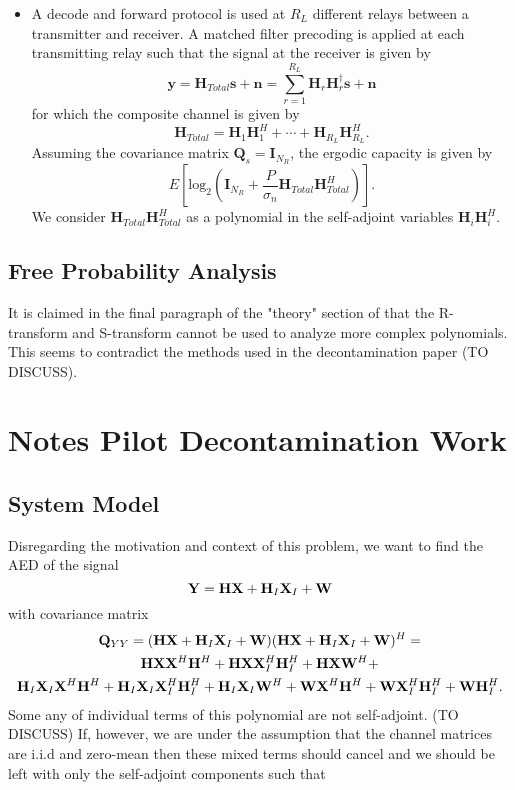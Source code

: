 \documentclass[12pt,a4paper]{report}
\begin{document}
\begin{itemize}
\item A decode and forward protocol is used at $R_L$ different relays between a transmitter and receiver. A matched filter precoding is applied at each transmitting relay such that the signal at the receiver is given by 
\begin{equation}
\mathbf{y} = \mathbf{H}_{Total} \mathbf{s} +  \mathbf{n} = \sum_{r=1}^{R_L} \mathbf{H}_{r}\mathbf{H}_{r}^{\dagger}\mathbf{s} +  \mathbf{n}
\end{equation}
for which the composite channel is given by 
\begin{equation}
\mathbf{H}_{Total} = \mathbf{H}_{1}\mathbf{H}_{1}^{H} +\cdots +\mathbf{H}_{R_L}\mathbf{H}_{R_L}^{H}.
\end{equation}
Assuming the covariance matrix $\mathbf{Q}_s = \mathbf{I}_{N_R}$, the ergodic capacity is given by 
\begin{equation}\label{ergodic_capacity}
E\left[\text{log}_2(\mathbf{I}_{N_R} + \frac{P}{\sigma_n}\mathbf{H}_{Total}\mathbf{H}_{Total}^H)\right].
\end{equation}
We consider $\mathbf{H}_{Total}\mathbf{H}_{Total}^H$ as a polynomial in the self-adjoint variables $\mathbf{H}_{i}\mathbf{H}_{i}^{H}$.
\end{itemize}
\subsection{Free Probability Analysis}
It is claimed in the final paragraph of the "theory" section of \cite{hadley2019capacity} that the R-transform and S-transform cannot be used to analyze more complex polynomials. This seems to contradict the methods used in the decontamination paper (TO DISCUSS). 


\section{Notes Pilot Decontamination Work}
\subsection{System Model}
Disregarding the motivation and context of this problem, we want to find the AED of the signal 
\begin{equation}
\mathbf{Y} = \mathbf{H}\mathbf{X} + \mathbf{H}_I \mathbf{X}_I + \mathbf{W}
\end{equation}
with covariance matrix 
\begin{gather*}
\mathbf{Q}_{YY} = (\mathbf{H}\mathbf{X} + \mathbf{H}_I \mathbf{X}_I + \mathbf{W})(\mathbf{H}\mathbf{X} + \mathbf{H}_I \mathbf{X}_I + \mathbf{W})^H = 
\\
\mathbf{H}\mathbf{X}\mathbf{X}^H\mathbf{H}^H + \mathbf{H}\mathbf{X}\mathbf{X}_I^H\mathbf{H}_I^H + \mathbf{H}\mathbf{X}\mathbf{W}^H +\\ \mathbf{H}_I \mathbf{X}_I \mathbf{X}^H\mathbf{H}^H + \mathbf{H}_I \mathbf{X}_I\mathbf{X}_I^H\mathbf{H}_I^H + \mathbf{H}_I \mathbf{X}_I\mathbf{W}^H + \mathbf{W}\mathbf{X}^H\mathbf{H}^H + \mathbf{W}\mathbf{X}_I^H\mathbf{H}_I^H + \mathbf{W}\mathbf{H}_I^H.
\end{gather*}
Some any of individual terms of this polynomial are not self-adjoint. (TO DISCUSS) If, however, we are under the assumption that the channel matrices are i.i.d and zero-mean then these mixed terms should cancel and we should be left with only the self-adjoint components such that
\end{document}
